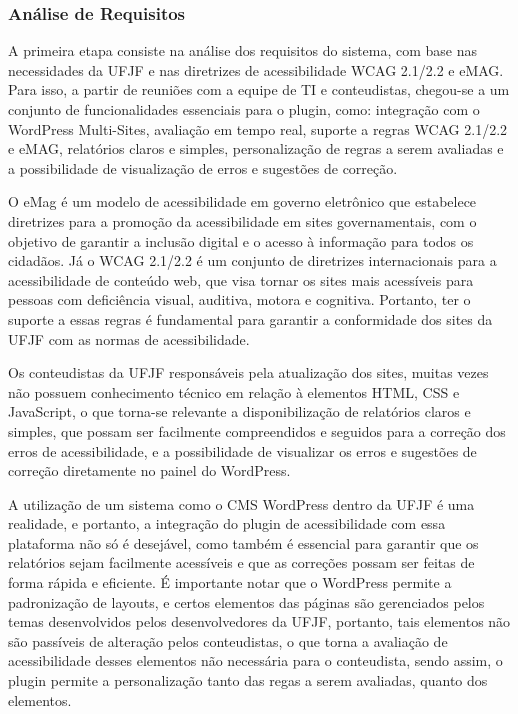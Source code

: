 \documentclass[12pt]{article}
\begin{document}
\subsubsection{Análise de Requisitos}
A primeira etapa consiste na análise dos requisitos do sistema, com base nas
necessidades da UFJF e nas diretrizes de acessibilidade WCAG 2.1/2.2 e 
eMAG\@. Para isso, a partir de reuniões com a equipe de TI e conteudistas, 
chegou-se a um conjunto de funcionalidades essenciais para o plugin, como: 
integração com o WordPress Multi-Sites, avaliação em tempo real, suporte a 
regras WCAG 2.1/2.2 e eMAG, relatórios claros e simples, personalização de 
regras a serem avaliadas e a possibilidade de visualização de erros e sugestões 
de correção.

O eMag é um modelo de acessibilidade em governo eletrônico que estabelece
diretrizes para a promoção da acessibilidade em sites governamentais, com o
objetivo de garantir a inclusão digital e o acesso à informação para todos os
cidadãos. Já o WCAG 2.1/2.2 é um conjunto de diretrizes internacionais para a
acessibilidade de conteúdo web, que visa tornar os sites mais acessíveis para
pessoas com deficiência visual, auditiva, motora e cognitiva. Portanto, ter o
suporte a essas regras é fundamental para garantir a conformidade dos sites da
UFJF com as normas de acessibilidade.

Os conteudistas da UFJF responsáveis pela atualização dos sites, muitas vezes não
possuem conhecimento técnico em relação à elementos HTML, CSS e JavaScript, o que
torna-se relevante a disponibilização de relatórios claros e simples, que possam
ser facilmente compreendidos e seguidos para a correção dos erros de acessibilidade,
e a possibilidade de visualizar os erros e sugestões de correção diretamente no
painel do WordPress.

A utilização de um sistema como o CMS WordPress dentro da UFJF é uma realidade, e
portanto, a integração do plugin de acessibilidade com essa plataforma não só
é desejável, como também é essencial para garantir que os relatórios sejam
facilmente acessíveis e que as correções possam ser feitas de forma rápida e
eficiente. É importante notar que o WordPress permite a padronização de layouts,
e certos elementos das páginas são gerenciados pelos temas desenvolvidos pelos
desenvolvedores da UFJF, portanto, tais elementos não são passíveis de alteração
pelos conteudistas, o que torna a avaliação de acessibilidade desses elementos
não necessária para o conteudista, sendo assim, o plugin permite a personalização
tanto das regas a serem avaliadas, quanto dos elementos.
\end{document}
